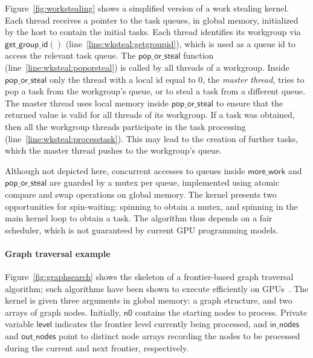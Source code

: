 \documentclass[numbers,nocopyrightspace,10pt]{sigplanconf}
\newcommand{\myfiglong}{Figure~}
\newcommand{\getgroupid}{\mathsf{get\_group\_id}}
\newcommand{\keyword}[1]{\mathsf{#1}}
\begin{document}
\myfiglong\ref{fig:workstealing} shows a simplified version of a work
stealing kernel. Each thread receives a pointer to the
task queues, in global memory, initialized by the
host to contain the initial tasks. Each thread identifies
its workgroup via $\getgroupid()$
(line~\ref{line:wksteal:getgroupid}), which is used as a queue id to access the relevant task queue. The
$\mathsf{pop\_or\_steal}$ function (line~\ref{line:wksteal:poporsteal})
is called by all threads of a workgroup.  Inside
$\mathsf{pop\_or\_steal}$ only the thread with a local id equal to $0$,
the \emph{master thread}, tries to pop a
task from the workgroup's queue, or to steal a task from a different
queue. The master thread uses local memory inside
$\mathsf{pop\_or\_steal}$ to ensure that the returned value is valid for
all threads of its workgroup. If a task was obtained, then all the
workgroup threads participate in the task processing (line~\ref{line:wksteal:processtask}).
This may lead to the creation of further tasks, which
the master thread pushes to the workgroup's queue.

Although not depicted here, concurrent accesses to queues inside
$\mathsf{more\_work}$ and $\mathsf{pop\_or\_steal}$ are guarded by a
mutex per queue, implemented using atomic compare and swap operations
on global memory.  The kernel presents two opportunities
for spin-waiting: spinning to obtain a mutex, and spinning in the main
kernel loop to obtain a task.  The algorithm thus depends
on a fair scheduler, which is not guaranteed by current GPU programming models.

\paragraph{Graph traversal example} \myfiglong\ref{fig:graphsearch} shows the
skeleton of a frontier-based graph traversal algorithm; such algorithms have
been shown to execute efficiently on GPUs~\cite{BNP12,DBLP:conf/oopsla/PaiP16}. 
The kernel is
given three arguments in global memory: a graph structure, and two
arrays of graph nodes. Initially, $\keyword{n0}$ contains the
starting nodes to process. Private variable $\keyword{level}$ indicates the frontier level currently being
processed, and $\keyword{in\_nodes}$ and $\keyword{out\_nodes}$ point to
distinct node arrays recording the nodes to be processed during the current and next frontier, respectively.
\end{document}
